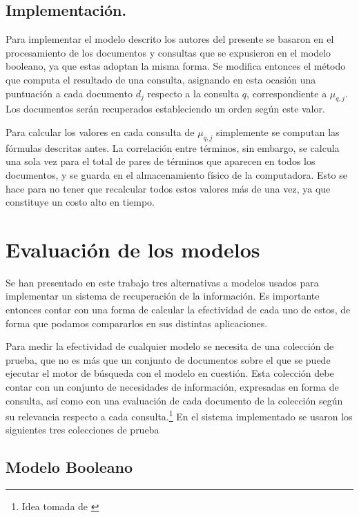 \documentclass{llncs}
\begin{document}
	\subsection{Implementaci\'on.}
		Para implementar el modelo descrito los autores del presente se basaron en el procesamiento de los documentos y consultas que se expusieron en el modelo booleano, ya que estas adoptan la misma forma. Se modifica entonces el m\'etodo que computa el resultado de una consulta, asignando en esta ocasi\'on una puntuaci\'on a cada documento  $d_j$ respecto a la consulta $q$, correspondiente a $\mu_{q,j}$. Los documentos ser\'an recuperados estableciendo un orden seg\'un este valor.
		
		Para calcular los valores en cada consulta de $\mu_{q,j}$ simplemente se computan las f\'ormulas descritas antes. La correlaci\'on entre t\'erminos, sin embargo, se calcula una sola vez para el total de pares de t\'erminos que aparecen en todos los documentos, y se guarda en el almacenamiento f\'isico de la computadora. Esto se hace para no tener que recalcular todos estos valores m\'as de una vez, ya que constituye un costo alto en tiempo.
	
	\section{Evaluaci\'on de los modelos}
	
	Se han presentado en este trabajo tres alternativas a modelos usados para implementar un sistema de recuperaci\'on de la informaci\'on. Es importante entonces contar con una forma de calcular la efectividad de cada uno de estos, de forma que podamos compararlos en sus distintas aplicaciones.
	
	Para medir la efectividad de cualquier modelo se necesita de una colecci\'on de  prueba, que no es m\'as que un conjunto de documentos sobre el que se puede ejecutar el motor de b\'usqueda con el modelo en cuesti\'on. Esta colecci\'on debe contar con un conjunto de necesidades de informaci\'on, expresadas en forma de consulta, as\'i como con una evaluaci\'on de cada documento de la colecci\'on seg\'un su relevancia respecto a cada consulta.\footnote{Idea tomada de \cite[Secci\'on 8.1]{B1}} En el sistema implementado se usaron los siguientes tres colecciones de prueba
	
	
	
	\subsection{Modelo Booleano}
	
\end{document}
